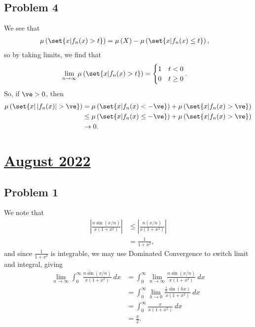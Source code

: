 \documentclass[10pt]{mypackage}
\begin{document}
\subsection{Problem 4}%
We see that
\begin{align*}
  \mu\left( \set{x | f_n(x) > t} \right) &= \mu\left( X \right) - \mu\left( \set{x | f_n(x) \leq t} \right),
\end{align*}
so by taking limits, we find that
\begin{align*}
  \lim_{n\rightarrow\infty} \mu\left( \set{x | f_n(x) > t} \right) &= \begin{cases}
    1 & t < 0\\
    0 & t\geq 0
  \end{cases}.
\end{align*}
So, if $\ve > 0$, then
\begin{align*}
  \mu\left( \set{x | \left\vert f_n(x) \right\vert > \ve} \right) &= \mu\left( \set{x | f_n(x) < -\ve} \right) + \mu\left( \set{x | f_n(x) > \ve} \right)\\
                                                                  &\leq \mu\left( \set{x | f_n(x)\leq -\ve} \right) + \mu\left( \set{x | f_n(x) > \ve} \right)\\
                                                                  &\rightarrow 0.
\end{align*}
\section{\href{https://math.virginia.edu/graduate/exams/analysis/2022Aug_real.pdf}{August 2022}}%
\subsection{Problem 1}%
We note that
\begin{align*}
  \left\vert \frac{n\sin\left( x/n \right)}{x\left( 1+x^2 \right)}  \right\vert &\leq \left\vert \frac{n\left( x/n \right)}{x\left( 1+x^2 \right)} \right\vert\\
                                                                                &= \frac{1}{1+x^2},
\end{align*}
and since $\frac{1}{1+x^2}$ is integrable, we may use Dominated Convergence to switch limit and integral, giving
\begin{align*}
  \lim_{n\rightarrow\infty} \int_{0}^{\infty} \frac{n\sin\left( x/n \right)}{x\left( 1+x^2 \right)}\:dx &= \int_{0}^{\infty} \lim_{n\rightarrow\infty}\frac{n\sin\left( x/n \right)}{x\left( 1+x^2 \right)}\:dx\\
                                                                                                        &= \int_{0}^{\infty} \lim_{h\rightarrow 0} \frac{\frac{1}{h}\sin\left( hx \right)}{x\left( 1+x^2 \right)}\:dx\\
                                                                                                        &= \int_{0}^{\infty} \frac{x}{x\left( 1+x^2 \right)}\:dx\\
                                                                                                        &= \frac{\pi}{2}.
\end{align*}
\end{document}
